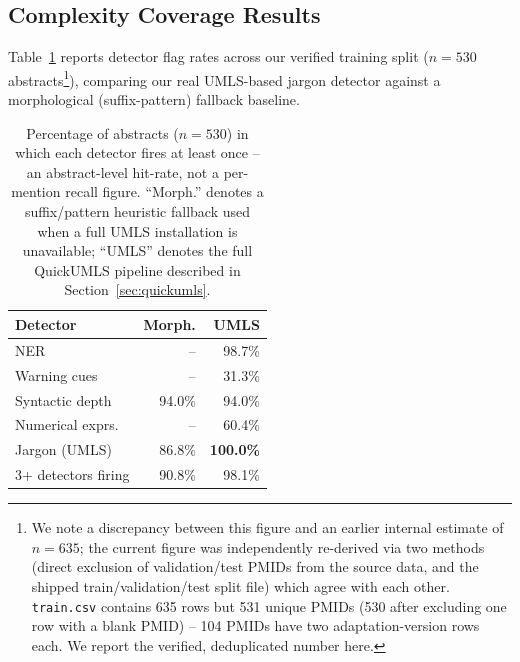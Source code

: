 \documentclass[11pt]{article}
\begin{document}
\subsection{Complexity Coverage Results}
\label{sec:complexity-results}

Table~\ref{tab:complexity-coverage} reports detector flag rates across our
verified training split ($n=530$ abstracts\footnote{We note a discrepancy
between this figure and an earlier internal estimate of $n=635$; the current
figure was independently re-derived via two methods (direct exclusion of
validation/test PMIDs from the source data, and the shipped train/validation/test
split file) which agree with each other. \texttt{train.csv} contains 635 rows but
531 unique PMIDs (530 after excluding one row with a blank PMID) -- 104 PMIDs have
two adaptation-version rows each. We report the verified, deduplicated number
here.}), comparing our real UMLS-based jargon detector against a
morphological (suffix-pattern) fallback baseline.

\begin{table}[t]
\centering
\small
\begin{tabular}{lrr}
\toprule
\textbf{Detector} & \textbf{Morph.} & \textbf{UMLS} \\
\midrule
NER              & --    & 98.7\% \\
Warning cues      & --    & 31.3\% \\
Syntactic depth   & 94.0\% & 94.0\% \\
Numerical exprs.  & --    & 60.4\% \\
Jargon (UMLS)     & 86.8\% & \textbf{100.0\%} \\
\midrule
3+ detectors firing & 90.8\% & 98.1\% \\
\bottomrule
\end{tabular}
\caption{Percentage of abstracts ($n=530$) in which each detector fires at
least once -- an abstract-level hit-rate, not a per-mention recall figure.
``Morph.'' denotes a suffix/pattern heuristic fallback used when a full UMLS
installation is unavailable; ``UMLS'' denotes the full QuickUMLS pipeline
described in Section~\ref{sec:quickumls}.}
\label{tab:complexity-coverage}
\end{table}
\end{document}
